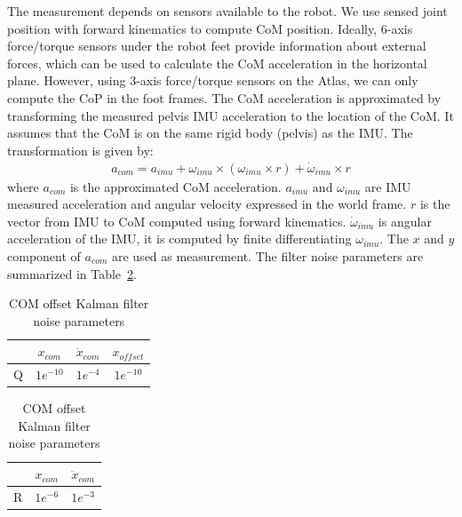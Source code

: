 \documentclass{ws-ijhr}
\begin{document}
The measurement depends on sensors available to the robot. We use sensed joint position with forward kinematics to compute CoM position. 
Ideally, 6-axis force/torque sensors under the robot feet provide information about external forces, which can be used to calculate the CoM acceleration in the horizontal plane. However, using 3-axis force/torque sensors on the Atlas, we can only compute the CoP in the foot frames. The CoM acceleration is approximated by transforming the measured pelvis IMU acceleration to the location of the CoM. It assumes that the CoM is on the same rigid body (pelvis) as the IMU. The transformation is given by:
\begin{align}
a_{com} = a_{imu} + \omega_{imu}\times(\omega_{imu}\times r) + \dot{\omega}_{imu} \times r
\label{eq:me-comdd}
\end{align}
where $a_{com}$ is the approximated CoM acceleration. $a_{imu}$ and $\omega_{imu}$ are IMU measured acceleration and angular velocity expressed in the world frame. $r$ is the vector from IMU to CoM computed using forward kinematics. $\dot{\omega}_{imu}$ is angular acceleration of the IMU, it is computed by finite differentiating $\omega_{imu}$. The $x$ and $y$ component of $a_{com}$ are used as measurement. The filter noise parameters are summarized in Table~\ref{T:me-Param}.
\begin{table} [h!]
\renewcommand{\arraystretch}{1.3}
\caption{COM offset Kalman filter noise parameters}
\label{T:me-Param}
\begin{center}
\begin{tabular}{c|c|c|c}\hline
{} & $ x_{com}$ & $\dot{x}_{com}$  & $x_{offset}$ \\\hline\hline
Q  & $1e^{-10}$ & $1e^{-4}$ & $1e^{-10}$ \\\hline
\end{tabular}
\quad
\begin{tabular}{c|c|c}\hline
{} & $x_{com}$ & $\ddot{x}_{com}$ \\\hline\hline
R & $1e^{-6}$ & $1e^{-3}$ \\\hline 
\end{tabular}
\end{center} 
\end{table}
\end{document}
